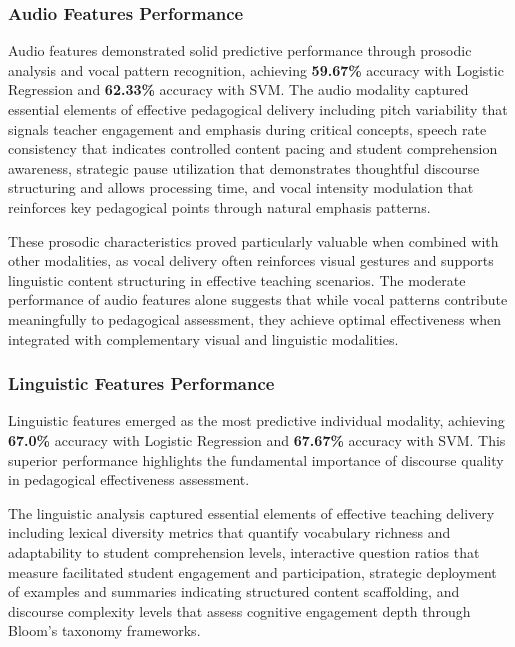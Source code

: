 \subsubsection{Audio Features Performance}

Audio features demonstrated solid predictive performance through prosodic analysis and vocal pattern recognition, achieving \textbf{59.67\%} accuracy with Logistic Regression and \textbf{62.33\%} accuracy with SVM. The audio modality captured essential elements of effective pedagogical delivery including pitch variability that signals teacher engagement and emphasis during critical concepts, speech rate consistency that indicates controlled content pacing and student comprehension awareness, strategic pause utilization that demonstrates thoughtful discourse structuring and allows processing time, and vocal intensity modulation that reinforces key pedagogical points through natural emphasis patterns.

These prosodic characteristics proved particularly valuable when combined with other modalities, as vocal delivery often reinforces visual gestures and supports linguistic content structuring in effective teaching scenarios. The moderate performance of audio features alone suggests that while vocal patterns contribute meaningfully to pedagogical assessment, they achieve optimal effectiveness when integrated with complementary visual and linguistic modalities.

\subsubsection{Linguistic Features Performance}

Linguistic features emerged as the most predictive individual modality, achieving \textbf{67.0\%} accuracy with Logistic Regression and \textbf{67.67\%} accuracy with SVM. This superior performance highlights the fundamental importance of discourse quality in pedagogical effectiveness assessment.

The linguistic analysis captured essential elements of effective teaching delivery including lexical diversity metrics that quantify vocabulary richness and adaptability to student comprehension levels, interactive question ratios that measure facilitated student engagement and participation, strategic deployment of examples and summaries indicating structured content scaffolding, and discourse complexity levels that assess cognitive engagement depth through Bloom's taxonomy frameworks.

